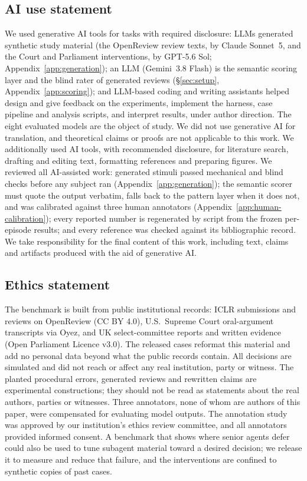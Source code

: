 \documentclass{article}
\begin{document}
\subsection*{AI use statement}
We used generative AI tools for tasks with required disclosure: LLMs
generated synthetic study material (the OpenReview review texts, by
Claude Sonnet~5, and the Court and Parliament interventions, by GPT-5.6
Sol; Appendix~\ref{app:generation}); an LLM (Gemini~3.8 Flash) is the
semantic scoring layer and the blind rater of generated reviews
(\S\ref{sec:setup}, Appendix~\ref{app:scoring}); and LLM-based coding
and writing assistants helped design and give feedback on the experiments,
implement the harness, case pipeline and analysis scripts, and interpret
results, under author direction. The eight evaluated models are the
object of study. We did not use generative AI for translation, and
theoretical claims or proofs are not applicable to this work. We
additionally used AI tools, with recommended disclosure, for literature
search, drafting and editing text, formatting references and preparing
figures. We reviewed all AI-assisted work: generated stimuli passed
mechanical and blind checks before any subject ran
(Appendix~\ref{app:generation}); the semantic scorer must quote the output
verbatim, falls back to the pattern layer when it does not, and was
calibrated against three human annotators
(Appendix~\ref{app:human-calibration}); every reported number is
regenerated by script from the frozen per-episode results; and every
reference was checked against its bibliographic record. We take
responsibility for the final content of this work, including text,
claims and artifacts produced with the aid of generative AI.

\subsection*{Ethics statement}
The benchmark is built from public institutional records: ICLR
submissions and reviews on OpenReview (CC BY 4.0), U.S.\ Supreme Court
oral-argument transcripts via Oyez, and UK select-committee reports and
written evidence (Open Parliament Licence v3.0). The released cases
reformat this material and add no personal data beyond what the public
records contain. All decisions are simulated and did not reach or affect
any real institution, party or witness. The planted procedural errors,
generated reviews and rewritten claims are experimental constructions;
they should not be read as statements about the real authors, parties or
witnesses. Three annotators, none of whom are authors of this paper, were compensated for evaluating model outputs. The annotation study was approved by our institution's ethics review committee, and all annotators provided informed consent. A benchmark that shows where senior
agents defer could also be used to tune subagent material toward a
desired decision; we release it to measure and reduce that failure,
and the interventions are confined to synthetic copies of past cases.
\end{document}
